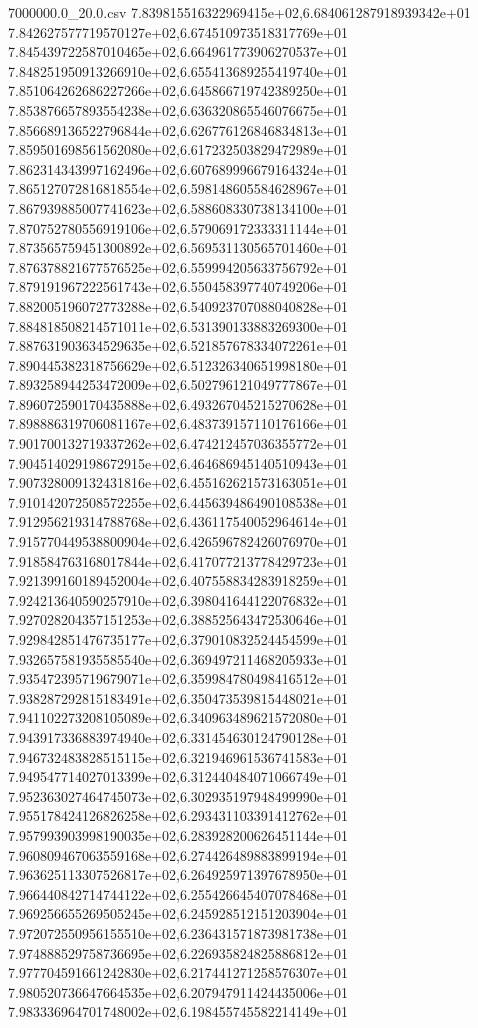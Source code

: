 \begin{filecontents*}{7000000.0_20.0.csv}
7.839815516322969415e+02,6.684061287918939342e+01
7.842627577719570127e+02,6.674510973518317769e+01
7.845439722587010465e+02,6.664961773906270537e+01
7.848251950913266910e+02,6.655413689255419740e+01
7.851064262686227266e+02,6.645866719742389250e+01
7.853876657893554238e+02,6.636320865546076675e+01
7.856689136522796844e+02,6.626776126846834813e+01
7.859501698561562080e+02,6.617232503829472989e+01
7.862314343997162496e+02,6.607689996679164324e+01
7.865127072816818554e+02,6.598148605584628967e+01
7.867939885007741623e+02,6.588608330738134100e+01
7.870752780556919106e+02,6.579069172333311144e+01
7.873565759451300892e+02,6.569531130565701460e+01
7.876378821677576525e+02,6.559994205633756792e+01
7.879191967222561743e+02,6.550458397740749206e+01
7.882005196072773288e+02,6.540923707088040828e+01
7.884818508214571011e+02,6.531390133883269300e+01
7.887631903634529635e+02,6.521857678334072261e+01
7.890445382318756629e+02,6.512326340651998180e+01
7.893258944253472009e+02,6.502796121049777867e+01
7.896072590170435888e+02,6.493267045215270628e+01
7.898886319706081167e+02,6.483739157110176166e+01
7.901700132719337262e+02,6.474212457036355772e+01
7.904514029198672915e+02,6.464686945140510943e+01
7.907328009132431816e+02,6.455162621573163051e+01
7.910142072508572255e+02,6.445639486490108538e+01
7.912956219314788768e+02,6.436117540052964614e+01
7.915770449538800904e+02,6.426596782426076970e+01
7.918584763168017844e+02,6.417077213778429723e+01
7.921399160189452004e+02,6.407558834283918259e+01
7.924213640590257910e+02,6.398041644122076832e+01
7.927028204357151253e+02,6.388525643472530646e+01
7.929842851476735177e+02,6.379010832524454599e+01
7.932657581935585540e+02,6.369497211468205933e+01
7.935472395719679071e+02,6.359984780498416512e+01
7.938287292815183491e+02,6.350473539815448021e+01
7.941102273208105089e+02,6.340963489621572080e+01
7.943917336883974940e+02,6.331454630124790128e+01
7.946732483828515115e+02,6.321946961536741583e+01
7.949547714027013399e+02,6.312440484071066749e+01
7.952363027464745073e+02,6.302935197948499990e+01
7.955178424126826258e+02,6.293431103391412762e+01
7.957993903998190035e+02,6.283928200626451144e+01
7.960809467063559168e+02,6.274426489883899194e+01
7.963625113307526817e+02,6.264925971397678950e+01
7.966440842714744122e+02,6.255426645407078468e+01
7.969256655269505245e+02,6.245928512151203904e+01
7.972072550956155510e+02,6.236431571873981738e+01
7.974888529758736695e+02,6.226935824825886812e+01
7.977704591661242830e+02,6.217441271258576307e+01
7.980520736647664535e+02,6.207947911424435006e+01
7.983336964701748002e+02,6.198455745582214149e+01

\end{filecontents*}

